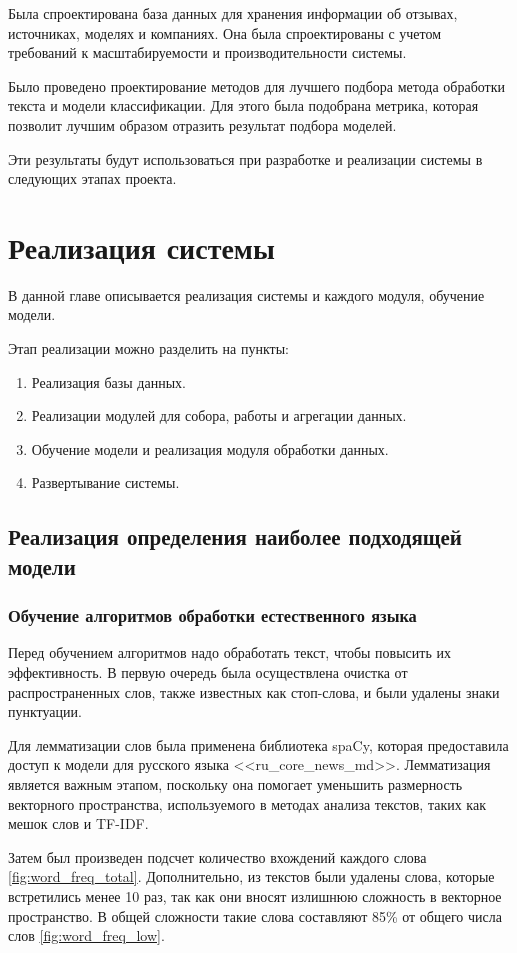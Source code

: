 \documentclass[PI, VKR]{HSEUniversity}
\begin{document}
Была спроектирована база данных для хранения информации об отзывах, источниках, моделях и компаниях. Она была спроектированы с учетом требований к масштабируемости и производительности системы.

Было проведено проектирование методов для лучшего подбора метода обработки текста и модели классификации. Для этого была подобрана метрика, которая позволит лучшим образом отразить результат подбора моделей.

Эти результаты будут использоваться при разработке и реализации системы в следующих этапах проекта.
\chapter{Реализация системы}
\label{sec:orgc0b8fc6}
В данной главе описывается реализация системы и каждого модуля, обучение модели.

Этап реализации можно разделить на пункты:
\begin{enumerate}
\item Реализация базы данных.
\item Реализации модулей для собора, работы и агрегации данных.
\item Обучение модели и реализация модуля обработки данных.
\item Развертывание системы.
\end{enumerate}
\section{Реализация определения наиболее подходящей модели}
\label{sec:orgf3e0b64}
\subsection{Обучение алгоритмов обработки естественного языка}
\label{sec:org3ec88e2}
Перед обучением алгоритмов надо обработать текст, чтобы повысить их эффективность. В первую очередь была осуществлена очистка от распространенных слов, также известных как стоп-слова, и были удалены знаки пунктуации.

Для лемматизации слов была применена библиотека spaCy\autocite{boyd_explosion_2023}, которая предоставила доступ к модели для русского языка {}<<ru\_core\_news\_md>>{}. Лемматизация является важным этапом, поскольку она помогает уменьшить размерность векторного пространства, используемого в методах анализа текстов, таких как мешок слов и TF-IDF.

Затем был произведен подсчет количество вхождений каждого слова \ref{fig:word_freq_total}. Дополнительно, из текстов были удалены слова, которые встретились менее 10 раз, так как они вносят излишнюю сложность в векторное пространство. В общей сложности такие слова составляют 85\% от общего числа слов \ref{fig:word_freq_low}.
\end{document}
